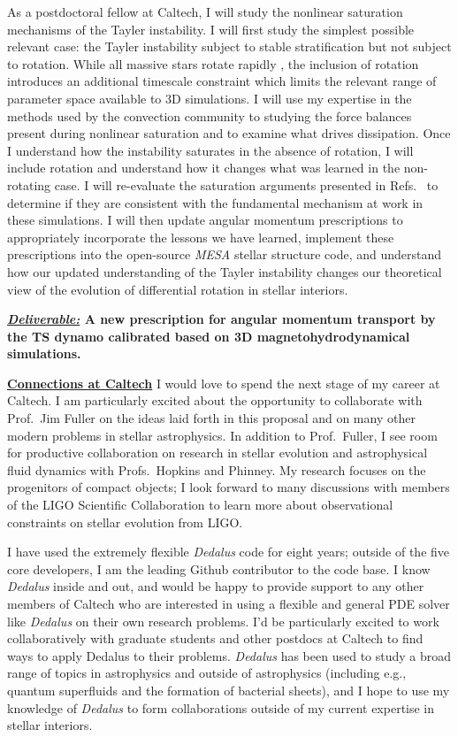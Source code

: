 \documentclass[12pt]{article}
\newcommand{\sct}[1]{\vspace{0.3cm}\hspace{-\parindent}\textbf{\underline{#1}}\hspace{0.3cm}}
\begin{document}
As a postdoctoral fellow at Caltech, I will study the nonlinear saturation mechanisms of the Tayler instability.
I will first study the simplest possible relevant case: the Tayler instability subject to stable stratification but not subject to rotation.
While all massive stars rotate rapidly \citep{jermyn_etal_2022_atlas}, the inclusion of rotation introduces an additional timescale constraint which limits the relevant range of parameter space available to 3D simulations.
I will use my expertise in the methods used by the convection community \citep{ahlers_etal_2009,aurnou_etal_2020} to studying the force balances present during nonlinear saturation and to examine what drives dissipation.
Once I understand how the instability saturates in the absence of rotation, I will include rotation and understand how it changes what was learned in the non-rotating case.
I will re-evaluate the saturation arguments presented in Refs.~\citep{spruit2002,fuller_etal_2019} to determine if they are consistent with the fundamental mechanism at work in these simulations.
I will then update angular momentum prescriptions to appropriately incorporate the lessons we have learned, implement these prescriptions into the open-source \emph{MESA} stellar structure code, and understand how our updated understanding of the Tayler instability changes our theoretical view of the evolution of differential rotation in stellar interiors.

\textbf{\underline{\emph{Deliverable:}} A new prescription for angular momentum transport by the TS dynamo calibrated based on 3D magnetohydrodynamical simulations.}

\sct{Connections at Caltech}
I would love to spend the next stage of my career at Caltech.
I am particularly excited about the opportunity to collaborate with Prof.~Jim Fuller on the ideas laid forth in this proposal and on many other modern problems in stellar astrophysics.
In addition to Prof.~Fuller, I see room for productive collaboration on research in stellar evolution and astrophysical fluid dynamics with Profs.~Hopkins and Phinney.
My research focuses on the progenitors of compact objects; I look forward to many discussions with members of the LIGO Scientific Collaboration to learn more about observational constraints on stellar evolution from LIGO.

I have used the extremely flexible \emph{Dedalus} code for eight years; outside of the five core developers, I am the leading Github contributor to the code base.
I know \emph{Dedalus} inside and out, and would be happy to provide support to any other members of Caltech who are interested in using a flexible and general PDE solver like \emph{Dedalus} on their own research problems.
I'd be particularly excited to work collaboratively with graduate students and other postdocs at Caltech to find ways to apply Dedalus to their problems.
\emph{Dedalus} has been used to study a broad range of topics in astrophysics and outside of astrophysics (including e.g., quantum superfluids and the formation of bacterial sheets), and I hope to use my knowledge of \emph{Dedalus} to form collaborations outside of my current expertise in stellar interiors.

{\small%

}
\end{document}
